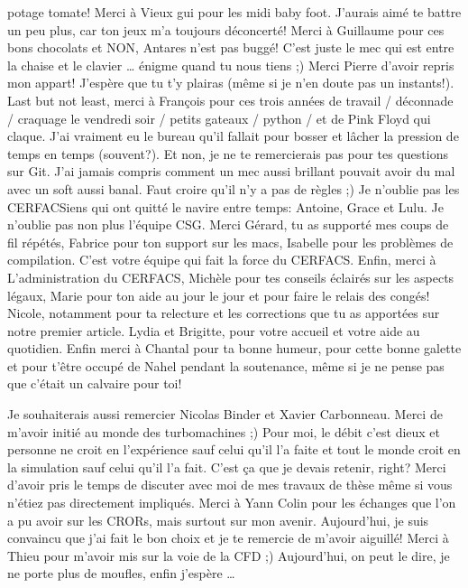 potage tomate! Merci à Vieux gui pour les midi baby foot. J'aurais aimé
te battre un peu plus, car ton jeux m'a toujours déconcerté! 
Merci à Guillaume pour ces bons chocolats et NON, Antares n'est pas buggé!
C'est juste le mec qui est entre la chaise et le clavier \ldots{} 
énigme quand tu nous tiens ;) 
Merci Pierre d'avoir repris mon appart! J'espère que tu t'y plairas
(même si je n'en doute pas un instants!).
Last but not least, merci à François pour ces
trois années de travail / déconnade / craquage le vendredi soir / 
petits gateaux / python / et de Pink Floyd qui claque. J'ai vraiment
eu le bureau qu'il fallait pour bosser et lâcher la pression de temps
en temps (souvent?). Et non, je ne te remercierais pas
pour tes questions sur Git. J'ai jamais compris comment 
un mec aussi brillant pouvait avoir du mal
avec un soft aussi banal. Faut croire qu'il n'y a pas de règles ;)
Je n'oublie pas les CERFACSiens qui ont quitté le navire entre temps:
Antoine, Grace et Lulu.
Je n'oublie pas non plus l'équipe CSG. Merci Gérard,
tu as supporté mes coups de fil répétés, Fabrice pour ton
support sur les macs, Isabelle pour les problèmes de
compilation. C'est votre équipe qui fait la force du CERFACS.
Enfin, merci à L'administration du CERFACS, Michèle pour tes
conseils éclairés sur les aspects légaux, Marie pour
ton aide au jour le jour et pour faire le relais des 
congés! Nicole, notamment pour ta relecture et les
corrections que tu as apportées sur notre premier
article. Lydia et Brigitte, pour votre accueil
et votre aide au quotidien.
Enfin merci à Chantal pour ta bonne humeur, pour 
cette bonne galette et pour t'être occupé de
Nahel pendant la soutenance, même si je ne pense
pas que c'était un calvaire pour toi!

Je souhaiterais aussi remercier Nicolas Binder et
Xavier Carbonneau. 
Merci de m'avoir initié au monde des turbomachines ;) Pour moi,
le débit c'est dieux et personne ne croit en l'expérience
sauf celui qu'il l'a faite et tout le monde croit en la
simulation sauf celui qu'il l'a fait. 
C'est ça que je devais retenir, right?
Merci d'avoir pris le temps de 
discuter avec moi de mes travaux de thèse même si
vous n'étiez pas directement impliqués.
Merci à Yann Colin pour les échanges que l'on a pu avoir
sur les CRORs, mais surtout sur mon avenir. Aujourd'hui,
je suis convaincu que j'ai fait le bon choix et je te remercie
de m'avoir aiguillé!
Merci à Thieu pour m'avoir mis sur la voie de la CFD ;)
Aujourd'hui, on peut le dire, je ne porte plus de moufles, enfin
j'espère \ldots{}

